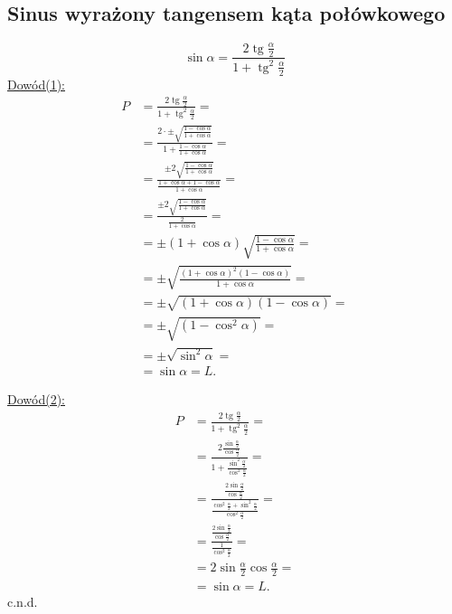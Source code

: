 \documentclass[12pt,a4paper,fleqn]{article}
\DeclareMathOperator{\tg}{tg}
\begin{document}
	\subsection{Sinus wyrażony tangensem kąta połówkowego}
		\begin{equation*}
		\sin\alpha = \frac{2\tg\frac{\alpha}{2}}{1+\tg^2\frac{\alpha}{2}}
		\end{equation*}
		\underline{Dowód(1):} \noindent
		\begin{align*}
			P &= \frac{2\tg\frac{\alpha}{2}}{1+\tg^2\frac{\alpha}{2}}=\\
			  &=\frac{2\cdot\pm\sqrt{\frac{1-\cos\alpha}{1+\cos\alpha}}}{1+\frac{1-\cos\alpha}{1+\cos\alpha}} =\\
			  &=\frac{\pm2\sqrt{\frac{1-\cos\alpha}{1+\cos\alpha}}}{\frac{1+\cos\alpha+1-\cos\alpha}{1+\cos\alpha}} =\\
			  &= \frac{\pm2\sqrt{\frac{1-\cos\alpha}{1+\cos\alpha}}}{\frac{2}{1+\cos\alpha}} =\\
			  &=\pm(1+\cos\alpha)\sqrt{\frac{1-\cos\alpha}{1+\cos\alpha}} =\\
			  &= \pm \sqrt{\frac{(1+\cos\alpha)^2(1-\cos\alpha)}{1+\cos\alpha}} =\\
			  &= \pm \sqrt{(1+\cos\alpha)(1-\cos\alpha)} =\\
			  &= \pm \sqrt{(1-\cos^2\alpha)} =\\
			  &= \pm \sqrt{\sin^2\alpha} = \\
			  &= \sin\alpha = L.
		\end{align*}
		
		\underline{Dowód(2):} \noindent
		\begin{align*}
			 P &= \frac{2\tg\frac{\alpha}{2}}{1+\tg^2\frac{\alpha}{2}}=\\
			   &=\frac{2\frac{\sin\frac{\alpha}{2}}{\cos\frac{\alpha}{2}}}{1+\frac{\sin^2\frac{\alpha}{2}}{\cos^2\frac{\alpha}{2}}} =\\
			   &=\frac{\frac{2\sin\frac{\alpha}{2}}{\cos\frac{\alpha}{2}}}{\frac{\cos^2\frac{\alpha}{2}+\sin^2\frac{\alpha}{2}}{\cos^2\frac{\alpha}{2}}} =\\
			   &= \frac{\frac{2\sin\frac{\alpha}{2}}{\cos\frac{\alpha}{2}}}{\frac{1}{\cos^2\frac{\alpha}{2}}} =\\
			   &= 2\sin\frac{\alpha}{2}\cos\frac{\alpha}{2} = \\
			   &= \sin\alpha = L.
		\end{align*}
		c.n.d.
\end{document}
